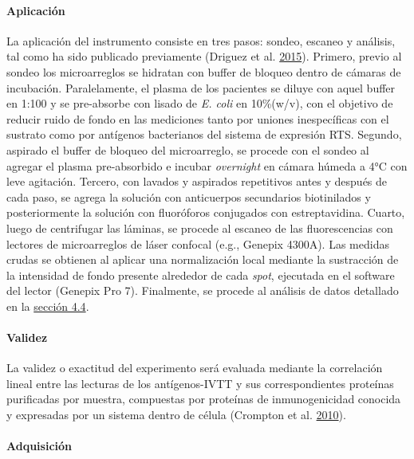 \documentclass[
  a4paper]{article}
\let\oldparagraph\paragraph
\renewcommand{\paragraph}[1]{\oldparagraph{#1}\mbox{}}
\begin{document}
\hypertarget{aplicaciuxf3n}{%
\paragraph{Aplicación}\label{aplicaciuxf3n}}

La aplicación del instrumento consiste en tres pasos: sondeo, escaneo y
análisis, tal como ha sido publicado previamente (Driguez et al.
\protect\hyperlink{ref-Driguez2015}{2015}). Primero, previo al sondeo
los microarreglos se hidratan con buffer de bloqueo dentro de cámaras de
incubación. Paralelamente, el plasma de los pacientes se diluye con
aquel buffer en 1:100 y se pre-absorbe con lisado de \emph{E. coli} en
10\%(w/v), con el objetivo de reducir ruido de fondo en las mediciones
tanto por uniones inespecíficas con el sustrato como por antígenos
bacterianos del sistema de expresión RTS. Segundo, aspirado el buffer de
bloqueo del microarreglo, se procede con el sondeo al agregar el plasma
pre-absorbido e incubar \emph{overnight} en cámara húmeda a 4°C con leve
agitación. Tercero, con lavados y aspirados repetitivos antes y después
de cada paso, se agrega la solución con anticuerpos secundarios
biotinilados y posteriormente la solución con fluoróforos conjugados con
estreptavidina. Cuarto, luego de centrifugar las láminas, se procede al
escaneo de las fluorescencias con lectores de microarreglos de láser
confocal (e.g., Genepix 4300A). Las medidas crudas se obtienen al
aplicar una normalización local mediante la sustracción de la intensidad
de fondo presente alrededor de cada \emph{spot}, ejecutada en el
software del lector (Genepix Pro 7). Finalmente, se procede al análisis
de datos detallado en la \protect\hyperlink{anadata}{sección 4.4}.

\hypertarget{validez}{%
\paragraph{Validez}\label{validez}}

La validez o exactitud del experimento será evaluada mediante la
correlación lineal entre las lecturas de los antígenos-IVTT y sus
correspondientes proteínas purificadas por muestra, compuestas por
proteínas de inmunogenicidad conocida y expresadas por un sistema dentro
de célula (Crompton et al. \protect\hyperlink{ref-crompton2010}{2010}).

\hypertarget{adquisiciuxf3n}{%
\paragraph{Adquisición}\label{adquisiciuxf3n}}
\end{document}

